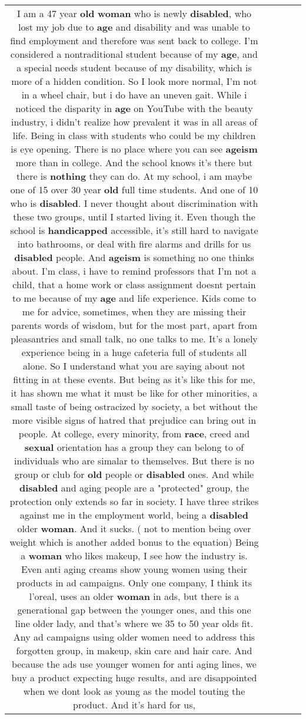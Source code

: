 \documentclass[11pt]{article}
\newlength\mylength
\begin{document}
\begin{center}
\begin{longtable}{|C{.65\mylength}|C{.30\mylength}|C{.12\mylength}|C{.12\mylength}|C{.12\mylength}|}
  \small I am a 47 year \textbf{old} \textbf{woman} who is newly \textbf{disabled}, who lost my job due to \textbf{age} and disability and was unable to find employment and therefore was sent back to college. I'm considered a nontraditional student because of my \textbf{age}, and a special needs student because of my disability, which is more of a hidden condition. So I look more normal, I'm not in a wheel chair, but i do have an uneven gait. While i noticed the disparity in \textbf{age} on YouTube with the beauty industry, i didn't realize how prevalent it was in all areas of life. Being in class with students who could be my children is eye opening. There is no place where you can see \textbf{ageism} more than in college. And the school knows it's there but there is \textbf{nothing} they can do. At my school, i am maybe one of 15 over 30 year \textbf{old} full time students. And one of 10 who is \textbf{disabled}. I never thought about discrimination with these two groups, until I started living it. Even though the school is \textbf{handicapped} accessible, it's still hard to navigate into bathrooms, or deal with fire alarms and drills for us \textbf{disabled} people. And \textbf{ageism} is something no one thinks about. I'm class, i have to remind professors that I'm not a child, that a home work or class assignment doesnt pertain to me because of my \textbf{age} and life experience. Kids come to me for advice, sometimes, when they are missing their parents words of wisdom, but for the most part, apart from pleasantries and small talk, no one talks to me. It's a lonely experience being in a huge cafeteria full of students all alone. So I understand what you are saying about not fitting in at these events. But being as it's like this for me, it has shown me what it must be like for other minorities, a small taste of being ostracized by society, a bet without the more visible signs of hatred that prejudice can bring out in people. At college, every minority, from \textbf{race}, creed and \textbf{sexual} orientation has a group they can belong to of individuals who are simalar to themselves. But there is no group or club for \textbf{old} people or \textbf{disabled} ones. And while \textbf{disabled} and aging people are a "protected" group, the protection only extends so far in society. I have three strikes against me in the employment world, being a \textbf{disabled} older \textbf{woman}. And it sucks. ( not to mention being over weight which is another added bonus to the equation) Being a \textbf{woman} who likes makeup, I see how the industry is. Even anti aging creams show young women using their products in ad campaigns. Only one company, I think its l'oreal, uses an older \textbf{woman} in ads, but there is a generational gap between the younger ones, and this one line older lady, and that's where we 35 to 50 year olds fit. Any ad campaigns using older women need to address this forgotten group, in makeup, skin care and hair care. And because the ads use younger women for anti aging lines, we buy a product expecting huge results,  and are disappointed when we dont look as young as the model touting the product. And it's hard for us, 
\end{longtable}
\end{center}
\end{document}
